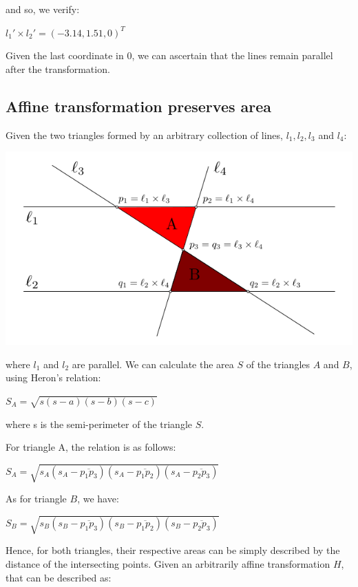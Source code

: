 \documentclass[]{article}
\begin{document}
\vspace{0.5em}

and so, we verify:

\centerline {
	$l_1' \times l_2'=(-3.14, 1.51, 0)^T$
}

Given the last coordinate in 0, we can ascertain that the lines remain parallel after the transformation.

\subsection{Affine transformation preserves area}

Given the two triangles formed by an arbitrary collection of lines, $l_1, l_2, l_3$ and $l_4$:


\centerline {
	\includegraphics[scale=0.5]{scr4}
}

where $l_1$ and $l_2$ are parallel. We can calculate the area $S$ of the triangles $A$ and $B$, using Heron's relation:

\centerline {
	$S_A = \sqrt{s(s-a)(s-b)(s-c)}$
} 

where s is the semi-perimeter of the triangle $S$.

For triangle A, the relation is as follows:

\centerline {
	$S_A=\sqrt{s_A(s_A - \overline{p_1p_3})(s_A - \overline{p_1p_2}) (s_A - \overline{p_2p_3})}$
}

As for triangle $B$, we have:

\centerline {
	$S_B=\sqrt{s_B(s_B - \overline{p_1p_3})(s_B - \overline{p_1p_2}) (s_B - \overline{p_2p_3})}$
}

Hence, for both triangles, their respective areas can be simply described by the distance of the intersecting points. Given an arbitrarily affine transformation $H$, that can be described as:
\end{document}
